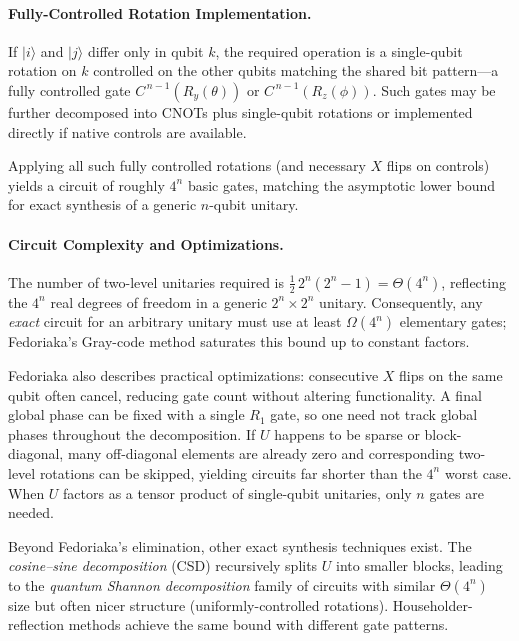 \paragraph{Fully-Controlled Rotation Implementation.}  
If $|i\rangle$ and $|j\rangle$ differ only in qubit $k$, the required operation is a single-qubit rotation on $k$ controlled on the other qubits matching the shared bit pattern—a fully controlled gate $C^{\,n-1}(R_y(\theta))$ or $C^{\,n-1}(R_z(\phi))$.\cite{fedoriaka2025decomposition} Such gates may be further decomposed into CNOTs plus single-qubit rotations or implemented directly if native controls are available.\cite{Barenco1995elementary}

Applying all such fully controlled rotations (and necessary $X$ flips on controls) yields a circuit of roughly $4^{n}$ basic gates, matching the asymptotic lower bound for exact synthesis of a generic $n$-qubit unitary.\cite{Shende2006synthesis}

\paragraph{Circuit Complexity and Optimizations.}  
The number of two-level unitaries required is $\tfrac12\,2^{n}(2^{n}-1)=\Theta(4^{n})$, reflecting the $4^{n}$ real degrees of freedom in a generic $2^{n}\!\times\!2^{n}$ unitary.\cite{Shende2006synthesis} Consequently, any \emph{exact} circuit for an arbitrary unitary must use at least $\Omega(4^{n})$ elementary gates; Fedoriaka’s Gray-code method saturates this bound up to constant factors.\cite{fedoriaka2025decomposition}

Fedoriaka also describes practical optimizations: consecutive $X$ flips on the same qubit often cancel, reducing gate count without altering functionality.\cite{fedoriaka2025decomposition} A final global phase can be fixed with a single $R_1$ gate, so one need not track global phases throughout the decomposition.\cite{Reck1994optics}  
If $U$ happens to be sparse or block-diagonal, many off-diagonal elements are already zero and corresponding two-level rotations can be skipped, yielding circuits far shorter than the $4^{n}$ worst case.\cite{Bullock2004gray} When $U$ factors as a tensor product of single-qubit unitaries, only $n$ gates are needed.\cite{Barenco1995elementary}

Beyond Fedoriaka’s elimination, other exact synthesis techniques exist. The \emph{cosine–sine decomposition} (CSD) recursively splits $U$ into smaller blocks, leading to the \emph{quantum Shannon decomposition} family of circuits with similar $\Theta(4^{n})$ size but often nicer structure (uniformly-controlled rotations).\cite{Miller2006csd} Householder-reflection methods achieve the same bound with different gate patterns.\cite{Shende2006synthesis}

